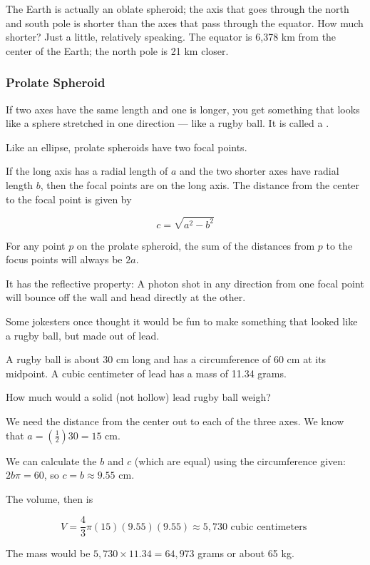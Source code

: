 The Earth is actually an oblate spheroid; the axis that goes through
the north and south pole is shorter than the axes that pass through
the equator. How much shorter? Just a little, relatively speaking. The equator is 6,378 km
from the center of the Earth; the north pole is 21 km closer.

\subsubsection{Prolate Spheroid}

If two axes have the same length and one is longer, you get something
that looks like a sphere stretched in one direction --- like a rugby
ball. It is called a .

Like an ellipse, prolate spheroids have two focal points.

\begin{mdframed}[style=important, frametitle={Focal Points of a Prolate Spheroid}]

  If the long axis has a radial length of $a$ and the two shorter axes
  have radial length $b$, then the focal points are on the long axis. The distance from the center to the focal point is given by

  $$c = \sqrt{a^2 - b^2}$$

  For any point $p$ on the prolate spheroid, the sum of the distances
  from $p$ to the focus points will always be $2a$.

  It has the reflective property: A photon shot in any direction
  from one focal point will bounce off the wall and head directly at the other.

\end{mdframed}

\begin{Exercise}[title={Volume of a Rugby Ball}, label=rugby_ball]

  Some jokesters once thought it would be fun to make something that looked like a rugby ball, but made out of lead.

  A rugby ball is about 30 cm long and has a circumference of 60 cm at
  its midpoint. A cubic centimeter of lead has a mass of 11.34 grams.

  How much would a solid (not hollow) lead rugby ball weigh?

\end{Exercise}
\begin{Answer}[ref=rugby_ball]

  We need the distance from the center out to each of the three axes. We know that $a = \left(\frac{1}{2} \right) 30 = 15$ cm.

  We can calculate the $b$ and $c$ (which are equal) using the circumference given: $2b\pi = 60$, so $c = b \approx 9.55$ cm.

  The volume, then is

  $$V = \frac{4}{3} \pi (15)(9.55)(9.55) \approx 5,730 \text{ cubic centimeters }$$

  The mass would be $5,730 \times 11.34 = 64,973$ grams or about 65 kg.
\end{Answer}

